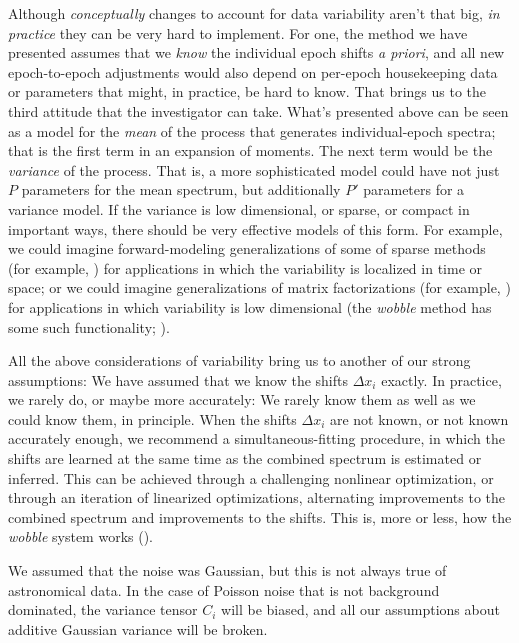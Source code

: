 \documentclass[modern]{aastex631}
\begin{document}
Although \emph{conceptually} changes to account for data variability aren't that big, \emph{in practice} they can be very hard to implement.
For one, the method we have presented assumes that we \emph{know} the individual epoch shifts \textsl{a priori}, and all new epoch-to-epoch adjustments would also depend on per-epoch housekeeping data or parameters that might, in practice, be hard to know.
That brings us to the third attitude that the investigator can take.
What's presented above can be seen as a model for the \emph{mean} of the process that generates individual-epoch spectra; that is the first term in an expansion of moments.
The next term would be the \emph{variance} of the process.
That is, a more sophisticated model could have not just $P$ parameters for the mean spectrum, but additionally $P'$ parameters for a variance model.
If the variance is low dimensional, or sparse, or compact in important ways, there should be very effective models of this form.
For example, we could imagine forward-modeling generalizations of some of sparse methods (for example, \citealt{candes}) for applications in which the variability is localized in time or space; or we could imagine generalizations of matrix factorizations (for example, \citealt{hmf}) for applications in which variability is low dimensional (the \textsl{wobble} method has some such functionality; \citealt{wobble}). %


All the above considerations of variability bring us to another of our strong assumptions:
We have assumed that we know the shifts $\Delta x_i$ exactly.
In practice, we rarely do, or maybe more accurately: We rarely know them as well as we could know them, in principle.
When the shifts $\Delta x_i$ are not known, or not known accurately enough, we recommend a simultaneous-fitting procedure, in which the shifts are learned at the same time as the combined spectrum is estimated or inferred.
This can be achieved through a challenging nonlinear optimization, or through an iteration of linearized optimizations, alternating improvements to the combined spectrum and improvements to the shifts.
This is, more or less, how the \textsl{wobble} system works (\citealt{wobble}).


We assumed that the noise was Gaussian, but this is not always true of astronomical data.
In the case of Poisson noise that is not background dominated, the variance tensor $C_i$ will be biased, and all our assumptions about additive Gaussian variance will be broken. %
\end{document}
